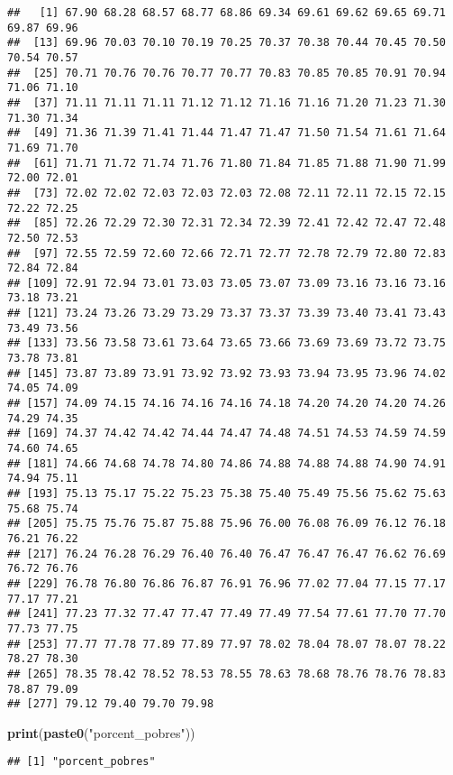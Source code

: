 \documentclass[
]{article}
\newenvironment{Shaded}{\begin{snugshade}}{\end{snugshade}}
\newcommand{\FunctionTok}[1]{\textcolor[rgb]{0.13,0.29,0.53}{\textbf{#1}}}
\newcommand{\NormalTok}[1]{#1}
\newcommand{\StringTok}[1]{\textcolor[rgb]{0.31,0.60,0.02}{#1}}
\begin{document}
\begin{verbatim}
##   [1] 67.90 68.28 68.57 68.77 68.86 69.34 69.61 69.62 69.65 69.71 69.87 69.96
##  [13] 69.96 70.03 70.10 70.19 70.25 70.37 70.38 70.44 70.45 70.50 70.54 70.57
##  [25] 70.71 70.76 70.76 70.77 70.77 70.83 70.85 70.85 70.91 70.94 71.06 71.10
##  [37] 71.11 71.11 71.11 71.12 71.12 71.16 71.16 71.20 71.23 71.30 71.30 71.34
##  [49] 71.36 71.39 71.41 71.44 71.47 71.47 71.50 71.54 71.61 71.64 71.69 71.70
##  [61] 71.71 71.72 71.74 71.76 71.80 71.84 71.85 71.88 71.90 71.99 72.00 72.01
##  [73] 72.02 72.02 72.03 72.03 72.03 72.08 72.11 72.11 72.15 72.15 72.22 72.25
##  [85] 72.26 72.29 72.30 72.31 72.34 72.39 72.41 72.42 72.47 72.48 72.50 72.53
##  [97] 72.55 72.59 72.60 72.66 72.71 72.77 72.78 72.79 72.80 72.83 72.84 72.84
## [109] 72.91 72.94 73.01 73.03 73.05 73.07 73.09 73.16 73.16 73.16 73.18 73.21
## [121] 73.24 73.26 73.29 73.29 73.37 73.37 73.39 73.40 73.41 73.43 73.49 73.56
## [133] 73.56 73.58 73.61 73.64 73.65 73.66 73.69 73.69 73.72 73.75 73.78 73.81
## [145] 73.87 73.89 73.91 73.92 73.92 73.93 73.94 73.95 73.96 74.02 74.05 74.09
## [157] 74.09 74.15 74.16 74.16 74.16 74.18 74.20 74.20 74.20 74.26 74.29 74.35
## [169] 74.37 74.42 74.42 74.44 74.47 74.48 74.51 74.53 74.59 74.59 74.60 74.65
## [181] 74.66 74.68 74.78 74.80 74.86 74.88 74.88 74.88 74.90 74.91 74.94 75.11
## [193] 75.13 75.17 75.22 75.23 75.38 75.40 75.49 75.56 75.62 75.63 75.68 75.74
## [205] 75.75 75.76 75.87 75.88 75.96 76.00 76.08 76.09 76.12 76.18 76.21 76.22
## [217] 76.24 76.28 76.29 76.40 76.40 76.47 76.47 76.47 76.62 76.69 76.72 76.76
## [229] 76.78 76.80 76.86 76.87 76.91 76.96 77.02 77.04 77.15 77.17 77.17 77.21
## [241] 77.23 77.32 77.47 77.47 77.49 77.49 77.54 77.61 77.70 77.70 77.73 77.75
## [253] 77.77 77.78 77.89 77.89 77.97 78.02 78.04 78.07 78.07 78.22 78.27 78.30
## [265] 78.35 78.42 78.52 78.53 78.55 78.63 78.68 78.76 78.76 78.83 78.87 79.09
## [277] 79.12 79.40 79.70 79.98
\end{verbatim}

\begin{Shaded}
\begin{Highlighting}[]
\FunctionTok{print}\NormalTok{(}\FunctionTok{paste0}\NormalTok{(}\StringTok{"porcent\_pobres"}\NormalTok{))}
\end{Highlighting}
\end{Shaded}

\begin{verbatim}
## [1] "porcent_pobres"
\end{verbatim}
\end{document}
